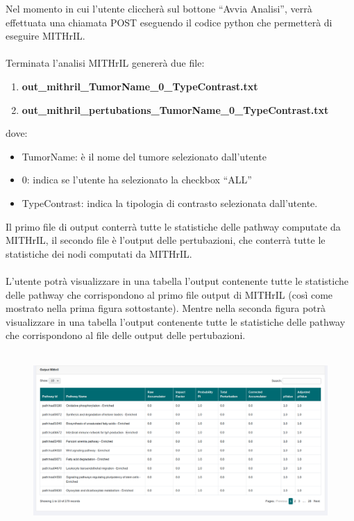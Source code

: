 \documentclass[10pt,a4paper]{report}
\newcommand{\virgolette}[1]{``#1''}
\begin{document}
Nel momento in cui l'utente cliccherà sul bottone \virgolette{Avvia Analisi}, verrà effettuata una chiamata POST eseguendo il codice python che permetterà di eseguire MITHrIL.\\\\Terminata l'analisi MITHrIL genererà due file: 
\begin{enumerate}
\item \textbf{out\_mithril\_TumorName\_0\_TypeContrast.txt}
\item \textbf{out\_mithril\_pertubations\_TumorName\_0\_TypeContrast.txt}
\end{enumerate}
dove:
\begin{itemize}
\item TumorName: è il nome del tumore selezionato dall'utente
\item 0: indica se l'utente ha selezionato la checkbox \virgolette{ALL}
\item TypeContrast: indica la tipologia di contrasto selezionata dall'utente.
\end{itemize}
Il primo file di output conterrà tutte le statistiche delle pathway computate da MITHrIL, il secondo file è l'output delle pertubazioni, che conterrà tutte le statistiche dei nodi computati da MITHrIL. \\\\L'utente potrà visualizzare in una tabella l'output contenente tutte le statistiche delle pathway che corrispondono al primo file output di MITHrIL (così come mostrato nella prima figura sottostante). Mentre nella seconda figura potrà visualizzare in una tabella l'output contenente tutte le statistiche delle pathway che corrispondono al file delle output delle pertubazioni.\\\\

\begin{figure}[H]
\centering%
\vspace{1ex}%
\includegraphics[scale=0.25]{outputMithril.png}  
\end{figure}
\end{document}
